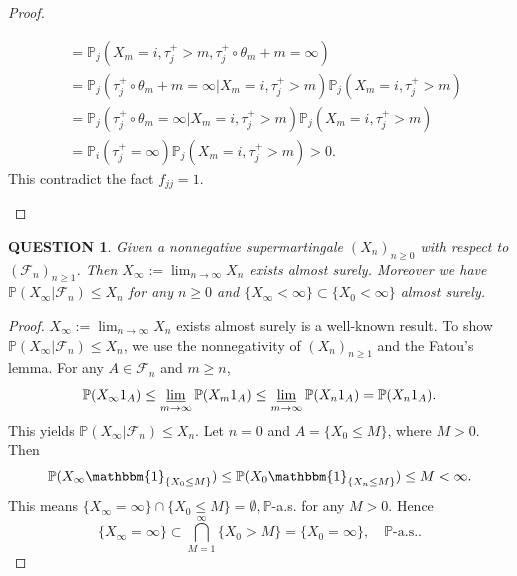 \documentclass[12pt]{article}
\renewcommand{\(}{\left(}%
\renewcommand{\)}{\right)}%
\renewcommand{\[}{\left[}%
\renewcommand{\]}{\right]}%
\newcommand{\p}{\mathbb{P}}
\newcommand{\f}{\mathscr{F}}
\newtheorem{question}{QUESTION}[section]}
\newtheorem{proof}{Proof.}}
\begin{document}
\begin{proof}
\begin{enumerate}
\begin{equation*}
\begin{split}
  				&=\p_j(X_m=i,\tau_j^+>m,\tau_j^+\circ\theta_m+m =\infty)\\
  				&=\p_j(\tau_j^+\circ\theta_m+m =\infty|X_m=i,\tau_j^+>m)\p_j(X_m=i,\tau_j^+>m)\\
  				&=\p_j(\tau_j^+\circ\theta_m =\infty|X_m=i,\tau_j^+>m)\p_j(X_m=i,\tau_j^+>m)\\
  				&=\p_i(\tau_j^+=\infty)\p_j(X_m=i,\tau_j^+>m)>0.
  			\end{split}
  		\end{equation*}
  		This contradict the fact $f_{jj}=1$.
  	\end{enumerate}
  \end{proof}
  
  \begin{question}
  	Given a nonnegative supermartingale $(X_n)_{n\geq 0}$ with respect to $(\f_n)_{n\geq 1}$. Then $X_\infty:=\lim_{n\to\infty}X_n$ exists almost surely. Moreover we have $\p(X_\infty|\f_n)\leq X_n$ for any $n\geq 0$ and $\{X_\infty<\infty\}\subset\{X_0<\infty\}$ almost surely.
  \end{question}
  \begin{proof}
  	$X_\infty:=\lim_{n\to\infty}X_n$ exists almost surely is a well-known result. To show $\p(X_\infty|\f_n)\leq X_n$, we use the nonnegativity of $(X_n)_{n\geq 1}$ and the Fatou's lemma. For any $A\in\f_n$ and $m\geq n$,
  	\begin{equation*}
  		\p(X_\infty 1_A)\leq \varliminf_{m\to\infty}\p(X_m1_A)\leq \varliminf_{m\to\infty}\p(X_n1_A)=\p(X_n1_A).
  	\end{equation*}
  	This yields  $\p(X_\infty|\f_n)\leq X_n$. Let $n=0$ and $A=\{X_0\leq M\}$, where $M>0$. Then 
  	\begin{equation*}
  		\p(X_\infty \mathbbm{1}_{\{X_0\leq M\}})\leq \p(X_0 \mathbbm{1}_{\{X_n\leq M\}})\leq M<\infty.
  	\end{equation*}
  	This means $\{X_\infty=\infty\}\cap\{X_0\leq M\}=\emptyset,\p$-a.s. for any $M>0$. Hence
  	\begin{equation*}
  		\{X_\infty=\infty\}\subset \bigcap_{M=1}^\infty\{X_0>M\}=\{X_0=\infty\},\quad \p\text{-a.s.}.
  	\end{equation*} 
  \end{proof}
  
\end{document}
